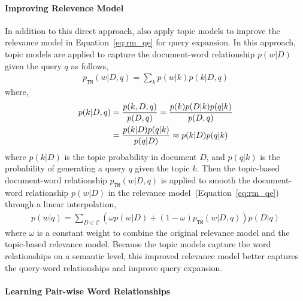 \paragraph{Improving Relevence Model}

In addition to this direct approach, \cite{Yi-2009} also apply topic
models to improve the relevance model in Equation~\ref{eq:rm_qe} for
query expansion. In this approach, topic models are applied to capture
the document-word relationship $p(w|D)$ given the query $q$ as
follows,
\begin{align}
p_{\texttt{TM}}(w|D,q) = \sum_k p(w|k) p(k|D,q)
\end{align}
where,
\begin{align}
p(k|D,q) &= \frac{p(k,D,q)}{p(D,q)}  = \frac{p(k)p(D|k)p(q|k)}{p(D,q)} \\
&= \frac{p(k|D)p(q|k)}{p(q|D)} \approx p(k|D)p(q|k) \notag
\end{align}
where $p(k|D)$ is the topic probability in document $D$, and $p(q|k)$
is the probability of generating a query $q$ given the topic $k$. Then
the topic-based document-word relationship $p_{\texttt{TM}}(w|D,q)$ is
applied to smooth the document-word relationship $p(w|D)$ in the
relevance model~(Equation~\ref{eq:rm_qe}) through a linear
interpolation,
\begin{align}
p(w|q) = \sum_{D \in \mathcal{C}} (\omega p(w|D) + (1 - \omega)p_{\texttt{TM}}(w|D,q))p(D|q)
\end{align}
where $\omega$ is a constant weight to combine the original relevance
model and the topic-based relevance model. Because the topic models
capture the word relationships on a semantic level, this improved
relevance model better captures the query-word relationships and
improve query expansion.

\paragraph{Learning Pair-wise Word Relationships}

